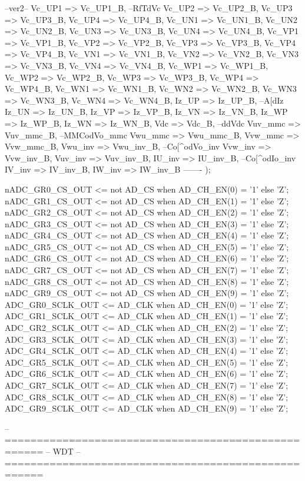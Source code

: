 \begin{mylisting}[language=VHDL,caption=トップモジュール,label=appF_Top_module_VHDL]
{{{			--ver2--
			Vc_UP1			=>	Vc_UP1_B,		--RfTdVc
			Vc_UP2			=>	Vc_UP2_B,
			Vc_UP3			=>	Vc_UP3_B,
			Vc_UP4			=>	Vc_UP4_B,
			Vc_UN1			=>	Vc_UN1_B,
			Vc_UN2			=>	Vc_UN2_B,
			Vc_UN3			=>	Vc_UN3_B,
			Vc_UN4			=>	Vc_UN4_B,
			Vc_VP1			=>	Vc_VP1_B,
			Vc_VP2			=>	Vc_VP2_B,
			Vc_VP3			=>	Vc_VP3_B,
			Vc_VP4			=>	Vc_VP4_B,
			Vc_VN1			=>	Vc_VN1_B,
			Vc_VN2			=>	Vc_VN2_B,
			Vc_VN3			=>	Vc_VN3_B,
			Vc_VN4			=>	Vc_VN4_B,
			Vc_WP1			=>	Vc_WP1_B,
			Vc_WP2			=>	Vc_WP2_B,
			Vc_WP3			=>	Vc_WP3_B,
			Vc_WP4			=>	Vc_WP4_B,
			Vc_WN1			=>	Vc_WN1_B,
			Vc_WN2			=>	Vc_WN2_B,
			Vc_WN3			=>	Vc_WN3_B,
			Vc_WN4			=>	Vc_WN4_B,
			Iz_UP				=>	Iz_UP_B,			--A[dIz
			Iz_UN				=>	Iz_UN_B,
			Iz_VP				=>	Iz_VP_B,
			Iz_VN				=>	Iz_VN_B,
			Iz_WP				=>	Iz_WP_B,
			Iz_WN				=>	Iz_WN_B,
			Vdc				=>	Vdc_B,			--ddVdc
			Vuv_mmc			=>	Vuv_mmc_B,		--MMCodVo_mmc
			Vwu_mmc			=>	Vwu_mmc_B,
			Vvw_mmc			=>	Vvw_mmc_B,
			Vwu_inv			=>	Vwu_inv_B,		--Co[^odVo_inv
			Vvw_inv			=>	Vvw_inv_B,
			Vuv_inv			=>	Vuv_inv_B,
			IU_inv			=>	IU_inv_B,		--Co[^odIo_inv
			IV_inv			=>	IV_inv_B,
			IW_inv			=>	IW_inv_B		
			-------
			);

	nADC_GR0_CS_OUT		<= not AD_CS when AD_CH_EN(0) = '1' else 'Z';
	nADC_GR1_CS_OUT		<= not AD_CS when AD_CH_EN(1) = '1' else 'Z';
	nADC_GR2_CS_OUT		<= not AD_CS when AD_CH_EN(2) = '1' else 'Z';
	nADC_GR3_CS_OUT		<= not AD_CS when AD_CH_EN(3) = '1' else 'Z';
	nADC_GR4_CS_OUT		<= not AD_CS when AD_CH_EN(4) = '1' else 'Z';
	nADC_GR5_CS_OUT		<= not AD_CS when AD_CH_EN(5) = '1' else 'Z';
	nADC_GR6_CS_OUT		<= not AD_CS when AD_CH_EN(6) = '1' else 'Z';
	nADC_GR7_CS_OUT		<= not AD_CS when AD_CH_EN(7) = '1' else 'Z';
	nADC_GR8_CS_OUT		<= not AD_CS when AD_CH_EN(8) = '1' else 'Z';
	nADC_GR9_CS_OUT		<= not AD_CS when AD_CH_EN(9) = '1' else 'Z';
	ADC_GR0_SCLK_OUT	<= AD_CLK when AD_CH_EN(0) = '1' else 'Z';
	ADC_GR1_SCLK_OUT	<= AD_CLK when AD_CH_EN(1) = '1' else 'Z';
	ADC_GR2_SCLK_OUT	<= AD_CLK when AD_CH_EN(2) = '1' else 'Z';
	ADC_GR3_SCLK_OUT	<= AD_CLK when AD_CH_EN(3) = '1' else 'Z';
	ADC_GR4_SCLK_OUT	<= AD_CLK when AD_CH_EN(4) = '1' else 'Z';
	ADC_GR5_SCLK_OUT	<= AD_CLK when AD_CH_EN(5) = '1' else 'Z';
	ADC_GR6_SCLK_OUT	<= AD_CLK when AD_CH_EN(6) = '1' else 'Z';
	ADC_GR7_SCLK_OUT	<= AD_CLK when AD_CH_EN(7) = '1' else 'Z';
	ADC_GR8_SCLK_OUT	<= AD_CLK when AD_CH_EN(8) = '1' else 'Z';
	ADC_GR9_SCLK_OUT	<= AD_CLK when AD_CH_EN(9) = '1' else 'Z';


-- ====================================================
-- WDT
-- ====================================================

}}}
\end{mylisting}
